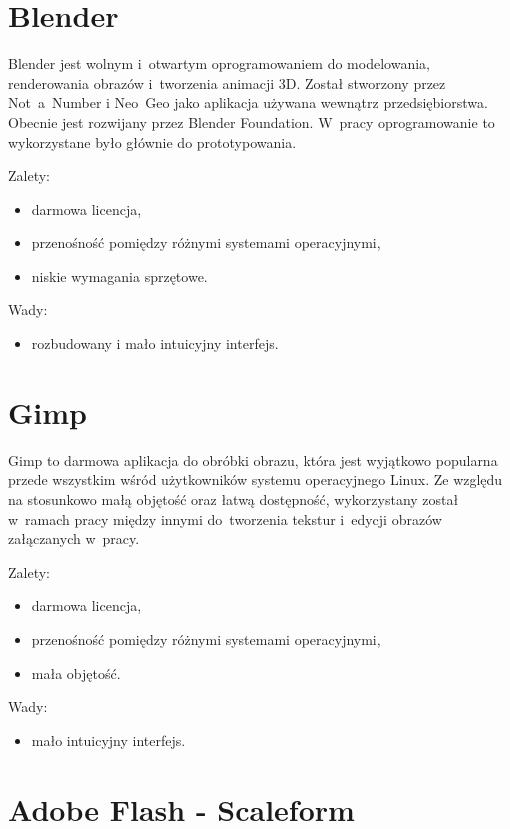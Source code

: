 \section{Blender}
Blender jest wolnym i~otwartym oprogramowaniem do modelowania, renderowania obrazów i~tworzenia animacji 3D. Został stworzony przez Not~a~Number i Neo~Geo jako aplikacja używana wewnątrz przedsiębiorstwa. Obecnie jest rozwijany przez Blender Foundation. W~pracy oprogramowanie to wykorzystane było głównie do prototypowania.

{\raggedright
Zalety:
\begin{itemize}
\item darmowa licencja,
\item przenośność pomiędzy różnymi systemami operacyjnymi,
\item niskie wymagania sprzętowe.
\end{itemize}

Wady:
\begin{itemize}
\item rozbudowany i mało intuicyjny interfejs.
\end{itemize}
}

\section{Gimp}

Gimp to darmowa aplikacja do obróbki obrazu, która jest wyjątkowo popularna przede wszystkim wśród użytkowników systemu operacyjnego Linux. Ze względu na stosunkowo małą objętość oraz łatwą dostępność, wykorzystany został w~ramach pracy między innymi do~tworzenia tekstur i~edycji obrazów załączanych w~pracy.

{\raggedright
Zalety:
\begin{itemize}
\item darmowa licencja,
\item przenośność pomiędzy różnymi systemami operacyjnymi,
\item mała objętość.
\end{itemize}

Wady:
\begin{itemize}
\item mało intuicyjny interfejs.
\end{itemize}
}

\section{Adobe Flash - Scaleform}

